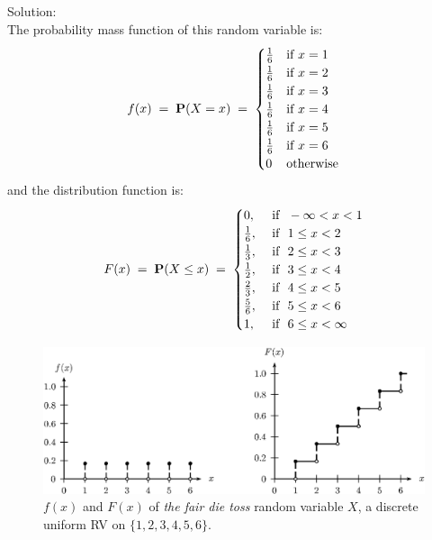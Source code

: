 \begin{example}
Solution:\\[4pt]
The probability mass function of this random variable is:
\[f(x)\;=\;\mathbf{P}(X=x)\;=\;
\begin{cases}
\frac{1}{6} & \text{if } x=1\\
\frac{1}{6} & \text{if } x=2\\
\frac{1}{6} & \text{if } x=3\\
\frac{1}{6} & \text{if } x=4\\
\frac{1}{6} & \text{if } x=5\\
\frac{1}{6} & \text{if } x=6\\
0 & \text{otherwise}
\end{cases}\] and the  distribution function is:
\[F(x)\; = \;\mathbf{P}(X \leq x) \;=\;
\begin{cases}
 0, & \text{ if } \ -\infty < x < 1\\
 \frac{1}{6}, & \text{ if } \ 1 \leq x < 2\\
\frac{1}{3}, & \text{ if } \ 2 \leq x < 3\\
\frac{1}{2}, & \text{ if } \ 3 \leq x < 4\\
\frac{2}{3}, & \text{ if } \ 4 \leq x < 5\\
\frac{5}{6}, & \text{ if } \ 5 \leq x < 6\\
 1,& \text{ if } \ 6 \leq x < \infty
\end{cases}
\]
\begin{figure}[htbp]
\begin{center}
\includegraphics{pstricks/fairdiefF}
\caption{$f(x)$ and $F(x)$ of {\em the fair die toss} random variable $X$, a discrete uniform RV on $\{1,2,3,4,5,6\}$.}
\end{center}
\end{figure}
\end{example}

